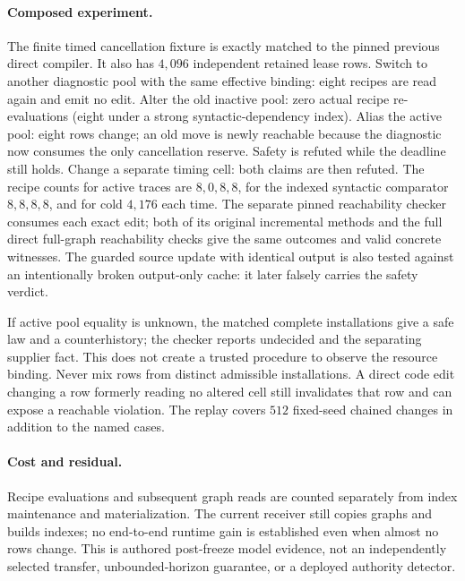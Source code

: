 \documentclass{article}
\begin{document}
\paragraph{Composed experiment.}
The finite timed cancellation fixture is exactly matched to the pinned
previous direct compiler. It also has $4{,}096$ independent retained
lease rows. Switch to another diagnostic pool with the same effective
binding: eight recipes are read again and emit no edit. Alter the old
inactive pool: zero actual recipe re-evaluations (eight under a strong
syntactic-dependency index). Alias the active pool: eight rows change;
an old move is newly reachable because the diagnostic now consumes the
only cancellation reserve. Safety is refuted while the deadline still
holds. Change a separate timing cell: both claims are then refuted.
The recipe counts for active traces are $8,0,8,8$, for the indexed
syntactic comparator $8,8,8,8$, and for cold $4{,}176$ each time.
The separate pinned reachability checker consumes each exact edit; both
of its original incremental methods and the full direct full-graph
reachability checks give the same outcomes and valid concrete witnesses.
The guarded source update with identical output is also tested against
an intentionally broken output-only cache: it later falsely carries
the safety verdict.

If active pool equality is unknown, the matched complete installations
give a safe law and a counterhistory; the checker reports undecided
and the separating supplier fact. This does not create a trusted
procedure to observe the resource binding. Never mix rows from distinct
admissible installations. A direct code edit changing a row formerly
reading no altered cell still invalidates that row and can expose a
reachable violation. The replay covers $512$ fixed-seed chained changes
in addition to the named cases.

\paragraph{Cost and residual.}
Recipe evaluations and subsequent graph reads are counted separately
from index maintenance and materialization. The current receiver
still copies graphs and builds indexes; no end-to-end runtime gain
is established even when almost no rows change. This is authored
post-freeze model evidence, not an independently selected transfer,
unbounded-horizon guarantee, or a deployed authority detector.
\end{document}
